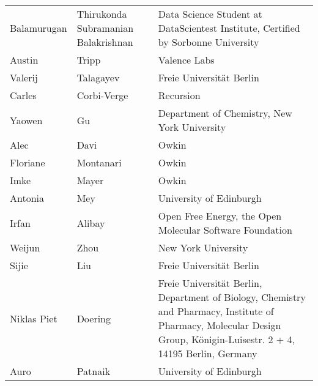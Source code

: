 \documentclass{article}
\begin{document}
\begin{table}[]
\begin{tabular}{lll}
\rowcolor[HTML]{F8F9FA} 
{\color[HTML]{434343} Balamurugan} & {\color[HTML]{434343} Thirukonda Subramanian Balakrishnan} & {\color[HTML]{434343} Data Science Student at DataScientest Institute, Certified by Sorbonne University} \\
\rowcolor[HTML]{FFFFFF} 
{\color[HTML]{434343} Austin} & {\color[HTML]{434343} Tripp} & {\color[HTML]{434343} Valence Labs} \\
\rowcolor[HTML]{F8F9FA} 
{\color[HTML]{434343} Valerij} & {\color[HTML]{434343} Talagayev} & {\color[HTML]{434343} Freie Universität Berlin} \\
\rowcolor[HTML]{FFFFFF} 
{\color[HTML]{434343} Carles} & {\color[HTML]{434343} Corbi-Verge} & {\color[HTML]{434343} Recursion} \\
\rowcolor[HTML]{F8F9FA} 
{\color[HTML]{434343} Yaowen} & {\color[HTML]{434343} Gu} & {\color[HTML]{434343} Department of Chemistry, New York University} \\
\rowcolor[HTML]{FFFFFF} 
{\color[HTML]{434343} Alec} & {\color[HTML]{434343} Davi} & {\color[HTML]{434343} Owkin} \\
\rowcolor[HTML]{F8F9FA} 
{\color[HTML]{434343} Floriane} & {\color[HTML]{434343} Montanari} & {\color[HTML]{434343} Owkin} \\
\rowcolor[HTML]{FFFFFF} 
{\color[HTML]{434343} Imke} & {\color[HTML]{434343} Mayer} & {\color[HTML]{434343} Owkin} \\
\rowcolor[HTML]{F8F9FA} 
{\color[HTML]{434343} Antonia} & {\color[HTML]{434343} Mey} & {\color[HTML]{434343} University of Edinburgh} \\
\rowcolor[HTML]{FFFFFF} 
{\color[HTML]{434343} Irfan} & {\color[HTML]{434343} Alibay} & {\color[HTML]{434343} Open Free Energy, the Open Molecular Software Foundation} \\
\rowcolor[HTML]{F8F9FA} 
{\color[HTML]{434343} Weijun} & {\color[HTML]{434343} Zhou} & {\color[HTML]{434343} New York University} \\
\rowcolor[HTML]{FFFFFF} 
{\color[HTML]{434343} Sijie} & {\color[HTML]{434343} Liu} & {\color[HTML]{434343} Freie Universität Berlin} \\
\rowcolor[HTML]{F8F9FA} 
{\color[HTML]{434343} Niklas Piet} & {\color[HTML]{434343} Doering} & {\color[HTML]{434343} Freie Universität Berlin, Department of Biology, Chemistry and Pharmacy, Institute of Pharmacy, Molecular Design Group, Königin-Luisestr. 2 + 4, 14195 Berlin, Germany} \\
\rowcolor[HTML]{FFFFFF} 
{\color[HTML]{434343} Auro} & {\color[HTML]{434343} Patnaik} & {\color[HTML]{434343} University of Edinburgh} \\

\end{tabular}
\end{table}
\end{document}
